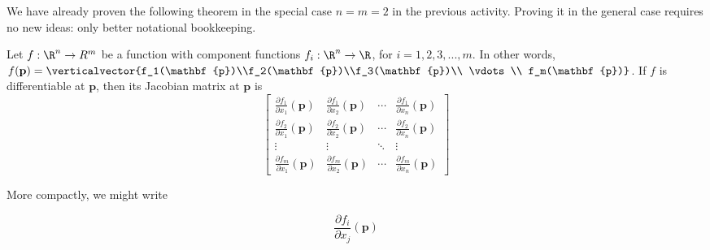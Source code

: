 \documentclass{ximera}
\begin{document}
	We have already proven the following theorem in the special case $n=m=2$ in the previous activity.  Proving it in the general case requires no new ideas: 
	 only better notational bookkeeping.
	
	\begin{theorem}
		Let $f:\R^n \to R^m$ be a function with component functions $f_i:\R^n \to \R$, for $i=1,2,3,...,m$.  In other words,
		$f(\mathbf{p}) = \verticalvector{f_1(\mathbf{p})\\f_2(\mathbf{p})\\f_3(\mathbf{p})\\ \vdots \\ f_m(\mathbf{p})}$.  If $f$ is differentiable at $\mathbf{p}$,
		 then its Jacobian matrix at $\mathbf{p}$ is 
                 \[
                 \begin{bmatrix}
                   \frac{\partial f_1}{\partial x_1} \left(\mathbf{p}\right) & \frac{\partial f_1}{\partial x_2} \left(\mathbf{p}\right) & \cdots & \frac{\partial f_1}{\partial x_n}\left(\mathbf{p}\right) \\
                   \frac{\partial f_2}{\partial x_1} \left(\mathbf{p}\right) & \frac{\partial f_2}{\partial x_2} \left(\mathbf{p}\right) & \cdots & \frac{\partial f_2}{\partial x_n}\left(\mathbf{p}\right) \\
                   \vdots                                                    & \vdots                                                    & \ddots & \vdots \\
                   \frac{\partial f_m}{\partial x_1} \left(\mathbf{p}\right) & \frac{\partial f_m}{\partial x_2} \left(\mathbf{p}\right) & \cdots & \frac{\partial f_m}{\partial x_n}\left(\mathbf{p}\right) 
                 \end{bmatrix}
                 \]
		  
		  More compactly, we might write
		  
		  \[
		  	\frac{\partial f_i}{\partial x_j} \left( \mathbf{p} \right)
		  \]
		  

	\end{theorem}
	
\end{document}
